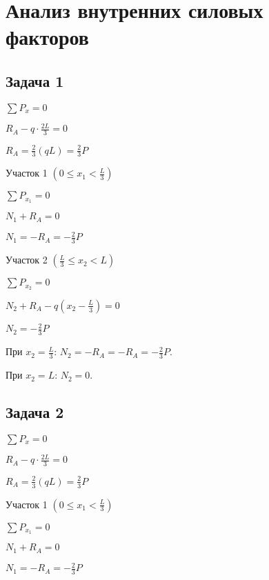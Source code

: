 \chapter{Анализ внутренних силовых факторов}

\section{Задача 1}

$ \sum P_x = 0 $

$ R_A - q \cdot \frac{2L}{3} = 0 $

$ R_A = \frac{2}{3} \left(qL\right) = \frac{2}{3} P $

\vspace{1.5ex}

Участок 1 $ \left(0 \le x_1 < \frac{L}{3}\right) $

$ \sum P_{x_1} = 0 $

$ N_1 + R_A = 0 $

$ N_1 = -R_A = -\frac{2}{3} P $

\vspace{1.5ex}

Участок 2 $ \left(\frac{L}{3} \le x_2 < L\right) $

$ \sum P_{x_2} = 0 $

$ N_2 + R_A - q \left(x_2 - \frac{L}{3}\right) = 0 $

$ N_2 = -\frac{2}{3} P $

При $ x_2 = \frac{L}{3} $: $ N_2 = -R_A = -R_A = -\frac{2}{3} P $.

При $ x_2 = L $:           $ N_2 = 0 $.


\section{Задача 2}

$ \sum P_x = 0 $

$ R_A - q \cdot \frac{2L}{3} = 0 $

$ R_A = \frac{2}{3} \left(qL\right) = \frac{2}{3} P $

\vspace{1.5ex}

Участок 1 $ \left(0 \le x_1 < \frac{L}{3}\right) $

$ \sum P_{x_1} = 0 $

$ N_1 + R_A = 0 $

$ N_1 = -R_A = -\frac{2}{3} P $

\vspace{1.5ex}


